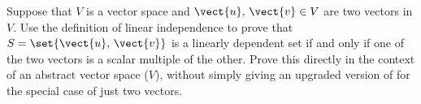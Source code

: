 Suppose that $V$ is a vector space and $\vect{u},\,\vect{v}\in V$ are two vectors in $V$.  Use the definition of linear independence to prove that $S=\set{\vect{u},\,\vect{v}}$ is a linearly dependent set if and only if one of the two vectors is a scalar multiple of the other.  Prove this directly in the context of an abstract vector space ($V$), without simply giving an upgraded version of  for the special case of just two vectors.